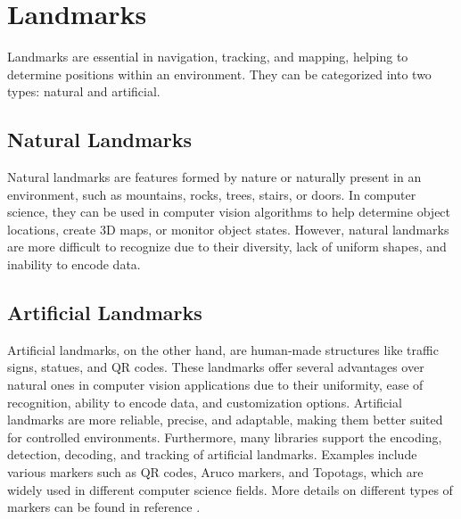 \section{Landmarks}

Landmarks are essential in navigation, tracking, and mapping, helping to determine positions within an environment. They can be categorized into two types: natural and artificial.

\subsection{Natural Landmarks}

Natural landmarks are features formed by nature or naturally present in an environment, such as mountains, rocks, trees, stairs, or doors. In computer science, they can be used in computer vision algorithms to help determine object locations, create 3D maps, or monitor object states. However, natural landmarks are more difficult to recognize due to their diversity, lack of uniform shapes, and inability to encode data.

\subsection{Artificial Landmarks}

Artificial landmarks, on the other hand, are human-made structures like traffic signs, statues, and QR codes. These landmarks offer several advantages over natural ones in computer vision applications due to their uniformity, ease of recognition, ability to encode data, and customization options. Artificial landmarks are more reliable, precise, and adaptable, making them better suited for controlled environments. Furthermore, many libraries support the encoding, detection, decoding, and tracking of artificial landmarks. Examples include various markers such as QR codes, Aruco markers, and Topotags, which are widely used in different computer science fields. More details on different types of markers can be found in reference \cite{Fiducial2021}.


